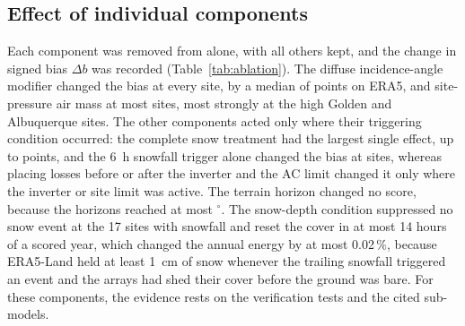 \documentclass[11pt]{article}
\begin{document}
\subsection{Effect of individual components}
\label{sec:ablation}

Each component was removed from \RePV{} alone, with all others kept, and the change in signed bias $\Delta b$ was recorded (Table~\ref{tab:ablation}). The diffuse incidence-angle modifier changed the bias at every site, by a median of \vAblIamSysEra{} points on ERA5, and site-pressure air mass at most sites, most strongly at the high Golden and Albuquerque sites. The other components acted only where their triggering condition occurred: the complete snow treatment had the largest single effect, up to \vAblSnowSysEraLo{} points, and the 6~h snowfall trigger alone changed the bias at \vAblTrigSysEraAct{} sites, whereas placing losses before or after the inverter and the AC limit changed it only where the inverter or site limit was active. The terrain horizon changed no score, because the horizons reached at most \vHorizonMax$^{\circ}$. The snow-depth condition suppressed no snow event at the 17 sites with snowfall and reset the cover in at most 14 hours of a scored year, which changed the annual energy by at most 0.02\,\%, because ERA5-Land held at least 1~cm of snow whenever the trailing snowfall triggered an event and the arrays had shed their cover before the ground was bare. For these components, the evidence rests on the verification tests and the cited sub-models.
\end{document}
